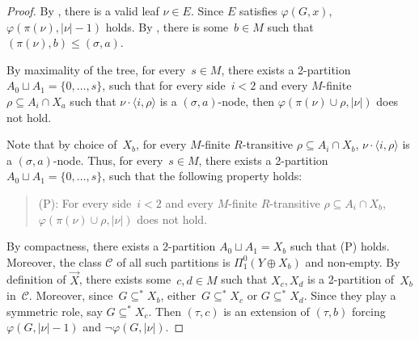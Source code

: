 \documentclass{article}
\numberwithin{theorem}{section}
\newtheorem{lemma}[theorem]{Lemma}
\newcommand{\C}{\mathcal{C}}
\newcommand{\M}{\mathcal{M}}
\begin{document}


\begin{proof}
By , there is a valid leaf  $\nu \in E$.
Since $E$ satisfies $\varphi(G, x)$, $\varphi(\pi(\nu), |\nu|-1)$ holds.
By , there is some~$b \in M$ such that $(\pi(\nu), b) \leq (\sigma, a)$.

By maximality of the tree, for every~$s \in M$, there exists a 2-partition $A_0 \sqcup A_1 = \{0,\dots,s\}$, such that for every side~$i < 2$ and every $M$-finite $\rho \subseteq A_i \cap X_a$ such that
$\nu \cdot \langle i, \rho \rangle$ is a $(\sigma, a)$-node, then $\varphi(\pi(\nu) \cup \rho, |\nu|)$ does not hold.

Note that by choice of~$X_b$, for every $M$-finite $R$-transitive $\rho \subseteq A_i \cap X_b$, $\nu \cdot \langle i, \rho \rangle$ is a $(\sigma, a)$-node. Thus, for every~$s \in M$, there exists a 2-partition $A_0 \sqcup A_1 = \{0,\dots,s\}$, such that the following property holds:
\begin{quote}
(P): For every side~$i < 2$ and every $M$-finite $R$-transitive $\rho \subseteq A_i \cap X_b$, $\varphi(\pi(\nu) \cup \rho, |\nu|)$ does not hold.
\end{quote}

By compactness, there exists a 2-partition $A_0 \sqcup A_1 = X_b$ such that (P) holds. Moreover, the class $\C$ of all such partitions is $\Pi^0_1(Y \oplus X_b)$ and non-empty. By definition of $\vec{X}$, there exists some~$c,d \in M$ such that $X_c, X_d$ is a 2-partition of~$X_b$ in~$\C$. Moreover, since~$G \subseteq^* X_b$, either~$G \subseteq^* X_c$ or $G \subseteq^* X_d$. Since they play a symmetric role, say $G \subseteq^* X_c$. Then $(\tau, c)$ is an extension of $(\tau, b)$ forcing $\varphi(G, |\nu|-1)$ and $\neg \varphi(G, |\nu|)$.
\end{proof}
\end{document}
